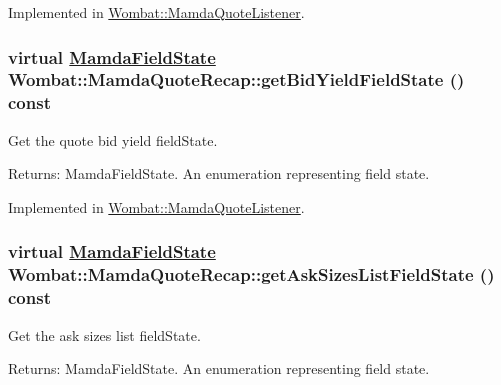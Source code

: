 Implemented in \hyperlink{classWombat_1_1MamdaQuoteListener_94700f1e9995a69f5005efce5dc368d1}{Wombat::Mamda\-Quote\-Listener}.\hypertarget{classWombat_1_1MamdaQuoteRecap_015aa2464a9035bc0fc46e8b22464b2d}{
\subsubsection[getBidYieldFieldState]{\setlength{\rightskip}{0pt plus 5cm}virtual \hyperlink{namespaceWombat_93aac974f2ab713554fd12a1fa3b7d2a}{Mamda\-Field\-State} Wombat::Mamda\-Quote\-Recap::get\-Bid\-Yield\-Field\-State () const}}
\label{classWombat_1_1MamdaQuoteRecap_015aa2464a9035bc0fc46e8b22464b2d}


Get the quote bid yield field\-State. 

\begin{Desc}
\item[Returns:]Mamda\-Field\-State. An enumeration representing field state. \end{Desc}


Implemented in \hyperlink{classWombat_1_1MamdaQuoteListener_fbf8ab1785c570733df4e0790947e489}{Wombat::Mamda\-Quote\-Listener}.\hypertarget{classWombat_1_1MamdaQuoteRecap_c159beb494cd9e208bf472bd4af0c194}{
\subsubsection[getAskSizesListFieldState]{\setlength{\rightskip}{0pt plus 5cm}virtual \hyperlink{namespaceWombat_93aac974f2ab713554fd12a1fa3b7d2a}{Mamda\-Field\-State} Wombat::Mamda\-Quote\-Recap::get\-Ask\-Sizes\-List\-Field\-State () const}}
\label{classWombat_1_1MamdaQuoteRecap_c159beb494cd9e208bf472bd4af0c194}


Get the ask sizes list field\-State. 

\begin{Desc}
\item[Returns:]Mamda\-Field\-State. An enumeration representing field state. \end{Desc}


